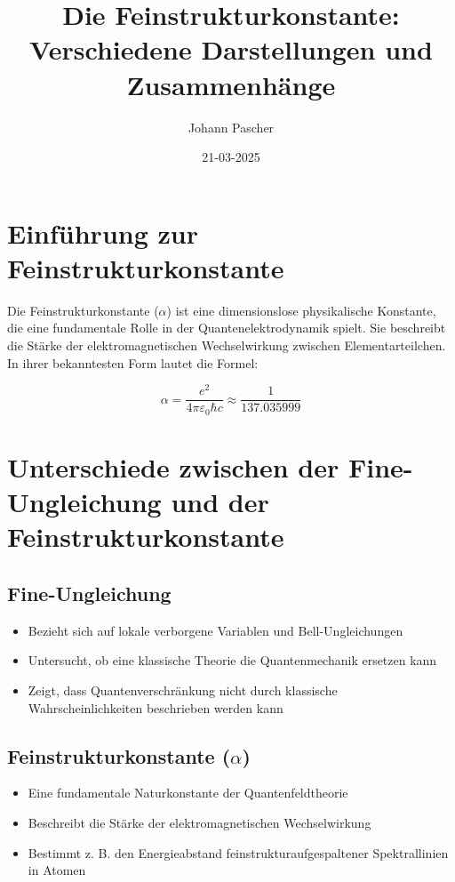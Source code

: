 \documentclass{article}
\title{Die Feinstrukturkonstante: Verschiedene Darstellungen und Zusammenhänge}
\author{Johann Pascher}
\date{21-03-2025}
\begin{document}
	
	\maketitle
	
	\section{Einführung zur Feinstrukturkonstante}
	
	Die Feinstrukturkonstante ($\alpha$) ist eine dimensionslose physikalische Konstante, die eine fundamentale Rolle in der Quantenelektrodynamik spielt. Sie beschreibt die Stärke der elektromagnetischen Wechselwirkung zwischen Elementarteilchen. In ihrer bekanntesten Form lautet die Formel:
	
	$$\alpha = \frac{e^2}{4\pi\varepsilon_0\hbar c} \approx \frac{1}{137.035999}$$
	
	\section{Unterschiede zwischen der Fine-Ungleichung und der Feinstrukturkonstante}
	
	\subsection{Fine-Ungleichung}
	\begin{itemize}
		\item Bezieht sich auf lokale verborgene Variablen und Bell-Ungleichungen
		\item Untersucht, ob eine klassische Theorie die Quantenmechanik ersetzen kann
		\item Zeigt, dass Quantenverschränkung nicht durch klassische Wahrscheinlichkeiten beschrieben werden kann
	\end{itemize}
	
	\subsection{Feinstrukturkonstante ($\alpha$)}
	\begin{itemize}
		\item Eine fundamentale Naturkonstante der Quantenfeldtheorie
		\item Beschreibt die Stärke der elektromagnetischen Wechselwirkung
		\item Bestimmt z. B. den Energieabstand feinstrukturaufgespaltener Spektrallinien in Atomen
	\end{itemize}
	
\end{document}
